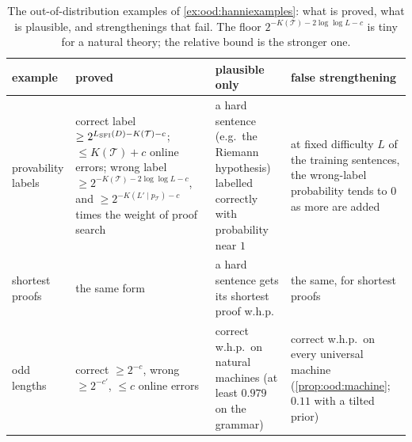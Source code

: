 \begin{table}[ht]
\centering\small\crefabbrev
\begin{tabularx}{\linewidth}{@{}p{2.1cm}XXX@{}}
\toprule
example & proved & plausible only & false strengthening \\
\midrule
provability labels & correct label $\ge2^{L_{\mathrm{SFI}}(D)-K(\mathcal T)-c}$; $\le K(\mathcal T)+c$ online errors; wrong label $\ge2^{-K(\mathcal T)-2\log\log L-c}$, and $\ge2^{-K(L'\mid p_{\mathcal T})-c}$ times the weight of proof search & a hard sentence (e.g.\ the Riemann hypothesis) labelled correctly with probability near $1$ & at fixed difficulty $L$ of the training sentences, the wrong-label probability tends to $0$ as more are added \\
shortest proofs & the same form & a hard sentence gets its shortest proof w.h.p. & the same, for shortest proofs \\
odd lengths & correct $\ge2^{-c}$, wrong $\ge2^{-c'}$, $\le c$ online errors & correct w.h.p.\ on natural machines (at least $0.979$ on the grammar) & correct w.h.p.\ on every universal machine (\cref{prop:ood:machine}; $0.11$ with a tilted prior) \\
\bottomrule
\end{tabularx}
\caption{The out-of-distribution examples of \cref{ex:ood:hanniexamples}: what is proved, what is plausible, and strengthenings that fail. The floor $2^{-K(\mathcal T)-2\log\log L-c}$ is tiny for a natural theory; the relative bound is the stronger one.}\label{tab:ood:hanni}
\end{table}
